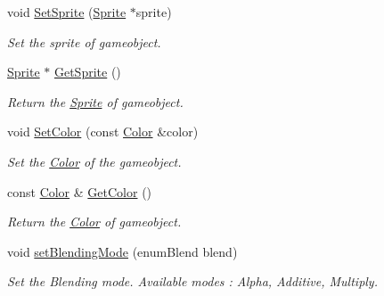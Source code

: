 \begin{DoxyCompactItemize}
\mbox{\label{class_game_object_a56f7b1343ae2edad88a1ba9662e76947}} 
void \mbox{\hyperlink{class_game_object_a56f7b1343ae2edad88a1ba9662e76947}{Set\+Sprite}} (\mbox{\hyperlink{class_sprite}{Sprite}} $\ast$sprite)
\begin{DoxyCompactList}\small\item\em Set the sprite of gameobject. \end{DoxyCompactList}\item 
\mbox{\label{class_game_object_a58483eb15bd91fc2ec516b1e234cd660}} 
\mbox{\hyperlink{class_sprite}{Sprite}} $\ast$ \mbox{\hyperlink{class_game_object_a58483eb15bd91fc2ec516b1e234cd660}{Get\+Sprite}} ()
\begin{DoxyCompactList}\small\item\em Return the \mbox{\hyperlink{class_sprite}{Sprite}} of gameobject. \end{DoxyCompactList}\item 
\mbox{\label{class_game_object_a22b28d62e571844384d6d1a5e6eec7a8}} 
void \mbox{\hyperlink{class_game_object_a22b28d62e571844384d6d1a5e6eec7a8}{Set\+Color}} (const \mbox{\hyperlink{class_color}{Color}} \&color)
\begin{DoxyCompactList}\small\item\em Set the \mbox{\hyperlink{class_color}{Color}} of the gameobject. \end{DoxyCompactList}\item 
\mbox{\label{class_game_object_a0a6f875bbb2657a2a0bed2126a84f0b7}} 
const \mbox{\hyperlink{class_color}{Color}} \& \mbox{\hyperlink{class_game_object_a0a6f875bbb2657a2a0bed2126a84f0b7}{Get\+Color}} ()
\begin{DoxyCompactList}\small\item\em Return the \mbox{\hyperlink{class_color}{Color}} of gameobject. \end{DoxyCompactList}\item 
\mbox{\label{class_game_object_a276120a8b680ba3c6e5e8f459c9fc0f4}} 
void \mbox{\hyperlink{class_game_object_a276120a8b680ba3c6e5e8f459c9fc0f4}{set\+Blending\+Mode}} (enum\+Blend blend)
\begin{DoxyCompactList}\small\item\em Set the Blending mode. Available modes \+: Alpha, Additive, Multiply. \end{DoxyCompactList}\item 

\end{DoxyCompactItemize}
